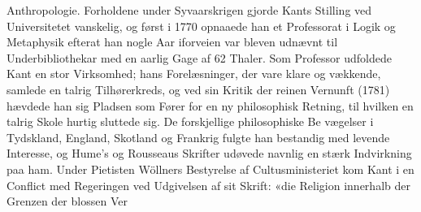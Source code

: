 \documentclass[12pt,a4paper]{book}
\begin{document}
Anthropologie. Forholdene under Syvaarskrigen gjorde Kants
Stilling ved Universitetet vanskelig, og først i 1770 opnaaede
han et Professorat i Logik og Metaphysik efterat han nogle
Aar iforveien var bleven udnævnt til Underbibliothekar med
en aarlig Gage af 62 Thaler. Som Professor udfoldede Kant
en stor Virksomhed; hans Forelæsninger, der vare klare
og vækkende, samlede en talrig Tilhørerkreds, og ved sin
Kritik der reinen Vernunft (1781) hævdede han sig Pladsen
som Fører for en ny philosophisk Retning, til hvilken en talrig
Skole hurtig sluttede sig. De forskjellige philosophiske Be\-%
vægelser i Tydskland, England, Skotland og Frankrig fulgte
han bestandig med levende Interesse, og Hume's og Rousseaus
Skrifter udøvede navnlig en stærk Indvirkning paa ham.
Under Pietisten Wöllners Bestyrelse af Cultusministeriet kom
Kant i en Conflict med Regeringen ved Udgivelsen af sit
Skrift: «die Religion innerhalb der Grenzen der blossen Ver\-%
\end{document}
